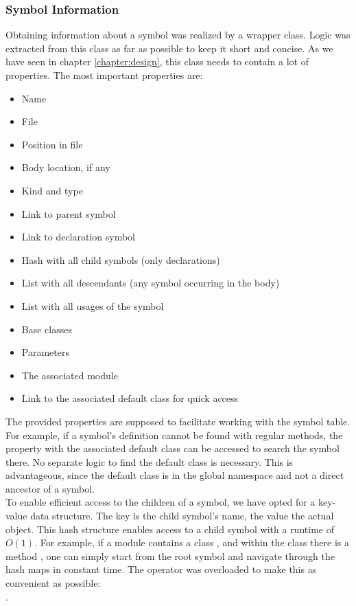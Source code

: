 \subsubsection{Symbol Information}
Obtaining information about a symbol was realized by a wrapper class.
Logic was extracted from this class as far as possible to keep it short and concise.
As we have seen in chapter \ref{chapter:design}, this class needs to contain a lot of properties.
The most important properties are:
\begin{itemize}
    \item Name
    \item File
    \item Position in file
    \item Body location, if any
    \item Kind and type
    \item Link to parent symbol
    \item Link to declaration symbol
    \item Hash with all child symbols (only declarations)
    \item List with all descendants (any symbol occurring in the body)
    \item List with all usages of the symbol
    \item Base classes
    \item Parameters
    \item The associated module
    \item Link to the associated default class for quick access
\end{itemize}

The provided properties are supposed to facilitate working with the symbol table.
For example, if a symbol's definition cannot be found with regular methods,
the property with the associated default class can be accessed to search the symbol there.
No separate logic to find the default class is necessary.
This is advantageous, since the default class is in the global namespace and not a direct ancestor of a symbol.\\

To enable efficient access to the children of a symbol, we have opted for a key-value data structure.
The key is the child symbol's name, the value the actual  object.
This hash structure enables access to a child symbol with a runtime of $O(1)$.
For example, if a module  contains a class , and within the class there is a method ,
one can simply start from the root symbol and navigate through the hash maps in constant time.
The \code{[]} operator was overloaded to make this as convenient as possible:\\
.\\

